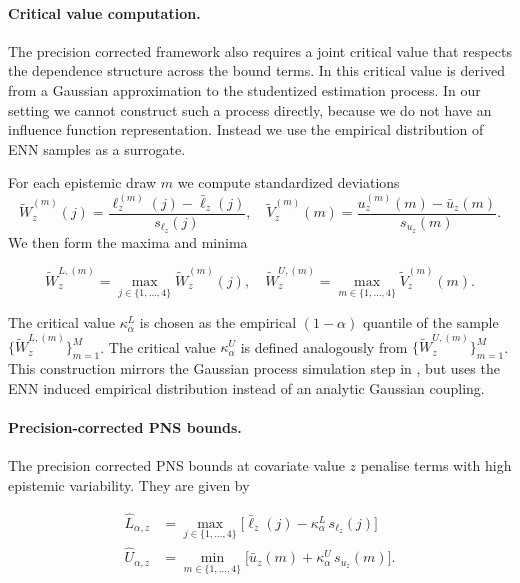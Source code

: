 \documentclass[accepted]{uai2026} %
\theoremstyle{plain}
\theoremstyle{definition}
\theoremstyle{remark}
\begin{document}
\paragraph{Critical value computation.}
The precision corrected framework also requires a joint critical value that
respects the dependence structure across the bound terms.
In \cite{chernozhukov2013intersection} this critical value is derived from
a Gaussian approximation to the studentized estimation process.
In our setting we cannot construct such a process directly, because we do
not have an influence function representation.
Instead we use the empirical distribution of ENN samples as a surrogate.

For each epistemic draw $m$ we compute standardized deviations
{\small
\begin{equation}
  \tilde{W}_z^{(m)}(j) = \frac{\ell_z^{(m)}(j) - \bar{\ell}_z(j)}{s_{\ell_z}(j)},
  \quad
  \tilde{V}_z^{(m)}(m) = \frac{u_z^{(m)}(m) - \bar{u}_z(m)}{s_{u_z}(m)}.
\end{equation}
}
We then form the maxima and minima


{
\small
\begin{equation}
  \tilde{W}_z^{L,(m)} = \max_{j \in \{1,\ldots,4\}} \tilde{W}_z^{(m)}(j),
  \quad
  \tilde{W}_z^{U,(m)} = \max_{m \in \{1,\ldots,4\}} \tilde{V}_z^{(m)}(m).
\end{equation}
}

The critical value $\kappa_\alpha^L$ is chosen as the empirical
$(1-\alpha)$ quantile of the sample
$\{\tilde{W}_z^{L,(m)}\}_{m=1}^M$.
The critical value $\kappa_\alpha^U$ is defined analogously from
$\{\tilde{W}_z^{U,(m)}\}_{m=1}^M$.
This construction mirrors the Gaussian process simulation step in
\cite{chernozhukov2013intersection}, but uses the ENN induced empirical
distribution instead of an analytic Gaussian coupling.

\paragraph{Precision-corrected PNS bounds.}
The precision corrected PNS bounds at covariate value $z$ penalise terms
with high epistemic variability.
They are given by


\begin{align}
    \hat{L}_{\alpha, z}
  &= \max_{j \in \{1,\ldots,4\}}
      \bigl[
        \bar{\ell}_z(j)
        - \kappa_\alpha^L\,s_{\ell_z}(j)
      \bigr]\\
\hat{U}_{\alpha, z}
  &= \min_{m \in \{1,\ldots,4\}}
      \bigl[
        \bar{u}_z(m)
        + \kappa_\alpha^U\,s_{u_z}(m)
      \bigr].    
\end{align}
\end{document}
